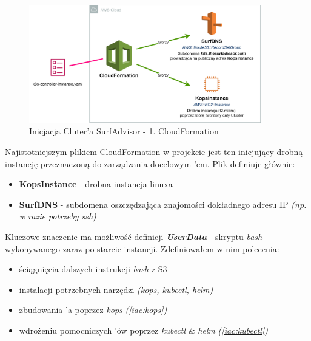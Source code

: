 \begin{figure}[!ht]
	\begin{center}
		\includegraphics[width=0.9\textwidth]{img/IAC-step1}
	\end{center}
	\caption{Inicjacja Cluter'a SurfAdvisor - 1. CloudFormation}
\end{figure}

Najistotniejszym plikiem CloudFormation w projekcie jest ten inicjujący drobną instancję przeznaczoną do zarządzania docelowym 'em.
Plik  definiuje głównie: 

\begin{itemize}
    \item
    \textbf{KopsInstance} - drobna instancja linuxa 
    
    \item
    \textbf{SurfDNS} - subdomena oszczędzająca znajomości dokładnego adresu IP \emph{(np. w razie potrzeby ssh)}
\end{itemize} 

Kluczowe znaczenie ma możliwość definicji \emph{\textbf{UserData}} - skryptu \emph{bash} wykonywanego zaraz po starcie instancji. 
Zdefiniowałem w nim polecenia:

\begin{itemize}
    \item
    ściągnięcia dalszych instrukcji \emph{bash} z S3

    \item
    instalacji potrzebnych narzędzi \emph{(kops, kubectl, helm)}
    
    \item
    zbudowania 'a poprzez \emph{kops} \emph{(\ref{iac:kops})}

    \item
    wdrożeniu pomocniczych 'ów poprzez \emph{kubectl} \& \emph{helm} \emph{(\ref{iac:kubectl})}
\end{itemize} 

